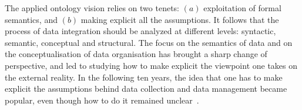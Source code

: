 \documentclass[ao]{iosart2x}
\newcommand{\nb}[1]{\textcolor{red}{$|$}\marginpar{\hspace*{-0cm}\parbox{20mm}{\scriptsize\raggedright\textcolor{red}{#1}}}}
\begin{document}
The applied ontology vision relies on two tenets: $(a)$ exploitation of formal semantics, and $(b)$ making explicit all the assumptions. It follows that the process of data integration should be analyzed at different levels: syntactic, semantic, conceptual and structural. %
The focus on the semantics of data and on the conceptualisation of data organisation has brought a sharp change of perspective, and led to studying how to make explicit the viewpoint one takes on the external reality. 
In the following ten years, the idea that one has to make explicit the assumptions behind data collection and data management became popular, even though how to do it remained unclear~\citep{oukselSemanticInteroperability1999}. 
\end{document}
